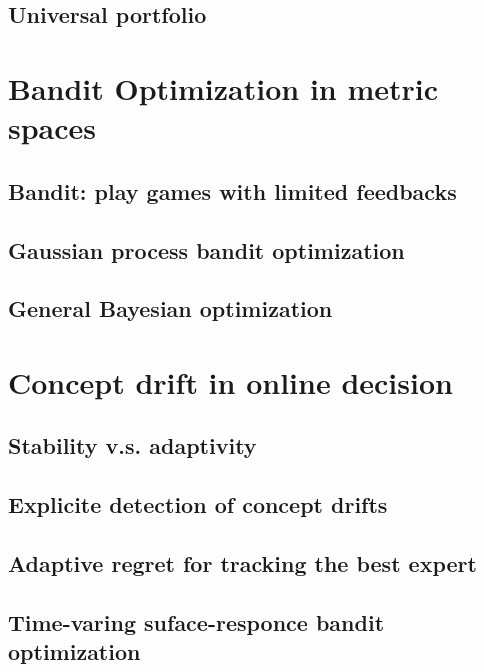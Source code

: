 \documentclass{beamer}
\begin{document}


\subsection{Universal portfolio}


\section{Bandit Optimization in metric spaces}
\subsection{Bandit: play games with limited feedbacks}
\subsection{Gaussian process bandit optimization}
\subsection{General Bayesian optimization} 

\section{Concept drift in online decision}
\subsection{Stability v.s. adaptivity}
\subsection{Explicite detection of concept drifts}
\subsection{Adaptive regret for tracking the best expert}
\subsection{Time-varing suface-responce bandit optimization}
\end{document}
